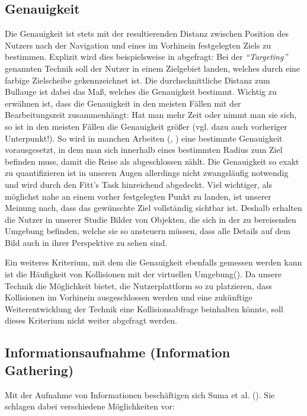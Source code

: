 \subsection{Genauigkeit}
Die Genauigkeit ist stets mit der resultierenden Distanz zwischen Position des Nutzers nach der Navigation und eines im Vorhinein festgelegten Ziels zu bestimmen. 
Explizit wird dies beispielsweise in \cite{Krekhov2018GulliVR} abgefragt: Bei der \textit{“Targeting”} genannten Technik soll der Nutzer in einem Zielgebiet landen, welches durch eine farbige Zielscheibe gekennzeichnet ist. Die durchschnittliche Distanz zum Bullauge ist dabei das Maß, welches die Genauigkeit bestimmt.
Wichtig zu erwähnen ist, dass die Genauigkeit in den meisten Fällen mit der Bearbeitungszeit zusammenhängt: Hat man mehr Zeit oder nimmt man sie sich, so ist in den meisten Fällen die Genauigkeit größer (vgl. dazu auch vorheriger Unterpunkt!).
So wird in manchen Arbeiten (\cite{BowmanTestbedTechniques}, \cite{3_Pierce1997}) eine bestimmte Genauigkeit vorausgesetzt, in dem man sich innerhalb eines bestimmten Radius zum Ziel befinden muss, damit die Reise als abgeschlossen zählt.
Die Genauigkeit so exakt zu quantifizieren ist in unseren Augen allerdings nicht zwangsläufig notwendig und wird durch den Fitt's Task hinreichend abgedeckt. 
Viel wichtiger, als möglichst nahe an einem vorher festgelegten Punkt zu landen, ist unserer Meinung nach, dass das gewünschte Ziel vollständig sichtbar ist. 
Deshalb erhalten die Nutzer in unserer Studie Bilder von Objekten, die sich in der zu bereisenden Umgebung befinden, welche sie so ansteuern müssen, dass alle Details auf dem Bild auch in ihrer Perspektive zu sehen sind.

Ein weiteres Kriterium, mit dem die Genauigkeit ebenfalls gemessen werden kann ist die Häufigkeit von Kollisionen mit der virtuellen Umgebung(\cite{Suma2010EvaluationEnvironments}). Da unsere Technik die Möglichkeit bietet, die Nutzerplattform so zu platzieren, dass Kollisionen im Vorhinein ausgeschlossen werden und eine zukünftige Weiterentwicklung der Technik eine Kollisionsabfrage beinhalten könnte, soll dieses Kriterium nicht weiter abgefragt werden.


\subsection{Informationsaufnahme (Information Gathering)}
Mit der Aufnahme von Informationen beschäftigen sich Suma et al. (\cite{Suma2010EvaluationEnvironments}). Sie schlagen dabei verschiedene Möglichkeiten vor:


